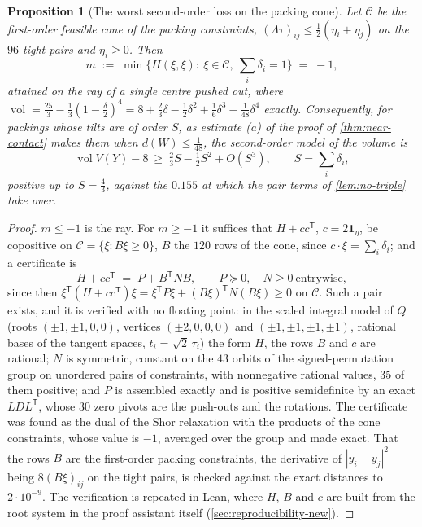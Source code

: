 \documentclass[11pt,reqno]{amsart}
\renewcommand{\_}{\origunderscore\allowbreak}
\numberwithin{equation}{section}
\theoremstyle{plain}
\newtheorem{prop}[thm]{Proposition}
\theoremstyle{definition}
\theoremstyle{remark}
\DeclareMathOperator{\vol}{vol}
\begin{document}
\begin{prop}[The worst second-order loss on the packing cone]\label{prop:cone-min}
Let $\mathcal C$ be the first-order feasible cone of the packing constraints,
$(\Lambda\tau)_{ij}\le\tfrac12(\eta_i+\eta_j)$ on the $96$ tight pairs and
$\eta_i\ge0$. Then
\[
  m\;:=\;\min\bigl\{H(\xi,\xi):\ \xi\in\mathcal C,\ \textstyle\sum_i\delta_i=1\bigr\}\;=\;-1 ,
\]
attained on the ray of a single centre pushed out, where
$\vol=\tfrac{25}3-\tfrac13(1-\tfrac\delta2)^4=8+\tfrac23\delta-\tfrac12\delta^2+\tfrac16\delta^3-\tfrac1{48}\delta^4$
exactly. Consequently, for packings whose tilts are of order $S$, as estimate
(a) of the proof of \cref{thm:near-contact} makes them when $d(W)\le\frac1{48}$,
the second-order model of the volume is
\[
  \vol V(Y)-8\ \ge\ \tfrac23S-\tfrac12S^2+O(S^3),\qquad S=\sum_i\delta_i ,
\]
positive up to $S=\tfrac43$, against the $0.155$ at which the pair terms of
\cref{lem:no-triple} take over.
\end{prop}

\begin{proof}
$m\le-1$ is the ray. For $m\ge-1$ it suffices that $H+cc^{\mathsf T}$,
$c=2\mathbf 1_\eta$, be copositive on $\mathcal C=\{\xi:B\xi\ge0\}$, $B$ the
$120$ rows of the cone, since $c\cdot\xi=\sum_i\delta_i$; and a certificate is
\[
  H+cc^{\mathsf T}\;=\;P+B^{\mathsf T}NB,\qquad P\succeq0,\quad N\ge0\ \text{entrywise},
\]
since then $\xi^{\mathsf T}(H+cc^{\mathsf T})\xi=\xi^{\mathsf T}P\xi+(B\xi)^{\mathsf T}N(B\xi)\ge0$
on $\mathcal C$. Such a pair exists, and it is verified with no floating
point:
in the scaled integral model of $Q$ (roots $(\pm1,\pm1,0,0)$, vertices
$(\pm2,0,0,0)$ and $(\pm1,\pm1,\pm1,\pm1)$, rational bases of the tangent
spaces, $t_i=\sqrt2\,\tau_i$) the form $H$, the rows $B$ and $c$ are
rational; $N$ is symmetric, constant on the $43$ orbits of the
signed-permutation group on unordered pairs of constraints, with
nonnegative rational values, $35$ of them positive; and $P$ is assembled
exactly and is positive semidefinite by an exact $LDL^{\mathsf T}$, whose $30$
zero pivots are the push-outs and the rotations. The certificate was found as
the dual of the Shor relaxation with the products of the cone constraints,
whose value is $-1$, averaged over the group and made
exact. That the rows $B$ are the first-order packing constraints, the
derivative of $|y_i-y_j|^2$ being $8(B\xi)_{ij}$ on the tight pairs, is checked
against the exact distances to $2\cdot10^{-9}$.
The verification is repeated in Lean, where $H$,
$B$ and $c$ are built from the root system in the proof assistant itself
(\cref{sec:reproducibility-new}).
\end{proof}
\end{document}
